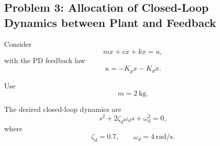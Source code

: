 \subsection*{Problem 3: Allocation of Closed-Loop Dynamics between Plant and Feedback}

Consider
\begin{equation}
m\ddot{x}+c\dot{x}+kx=u,
\end{equation}
with the PD feedback law
\begin{equation}
u=-K_px-K_d\dot{x}.
\end{equation}

Use
\begin{equation}
m=2~\mathrm{kg}.
\end{equation}

The desired closed-loop dynamics are
\begin{equation}
s^2
+
2\zeta_d\omega_d s
+
\omega_d^2
=
0,
\end{equation}
where
\begin{equation}
\zeta_d=0.7,
\qquad
\omega_d=4~\mathrm{rad/s}.
\end{equation}

